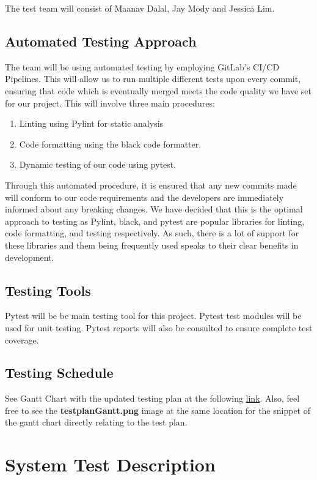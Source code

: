 \documentclass[12pt, titlepage]{article}
\begin{document}
The test team will consist of Maanav Dalal, Jay Mody and Jessica Lim.

\subsection{Automated Testing Approach}
The team will be using automated testing by employing GitLab's CI/CD Pipelines. This will allow us to run multiple different tests upon every commit, ensuring that code which is eventually merged meets the code quality we have set for our project. This will involve three main procedures:
\begin{enumerate}
    \item Linting using Pylint for static analysis
    \item Code formatting using the black code formatter.
    \item Dynamic testing of our code using pytest.
\end{enumerate}

Through this automated procedure, it is ensured that any new commits made will conform to our code requirements and the developers are immediately informed about any breaking changes. We have decided that this is the optimal approach to testing as Pylint, black, and pytest are popular libraries for linting, code formatting, and testing respectively. As such, there is a lot of support for these libraries and them being frequently used speaks to their clear benefits in development.
\subsection{Testing Tools}

Pytest will be be main testing tool for this project. Pytest test modules will be used for unit testing. Pytest reports will also be consulted to ensure complete test coverage.

\subsection{Testing Schedule}

See Gantt Chart with the updated testing plan at the following \href{https://gitlab.cas.mcmaster.ca/modyj/3xa3/-/tree/master/ProjectSchedule}{link}.
Also, feel free to see the \textbf{testplanGantt.png} image at the same location for the snippet of the gantt chart directly relating to the test plan. 

\section{System Test Description}
\end{document}
